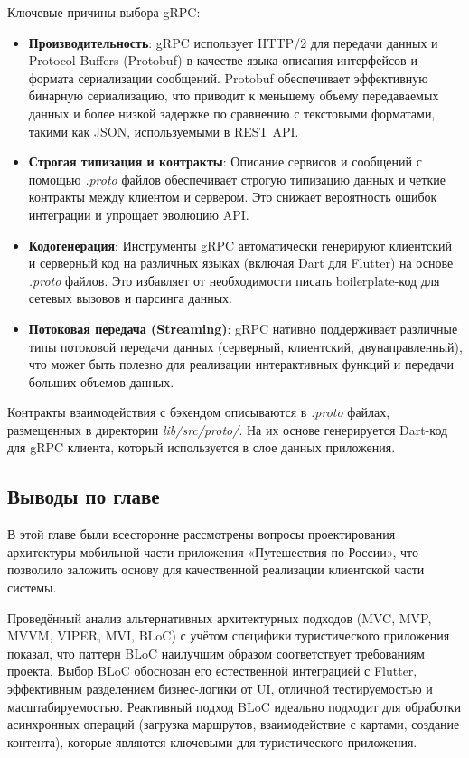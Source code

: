 Ключевые причины выбора gRPC:
\begin{itemize}
    \item \textbf{Производительность}: gRPC использует HTTP/2 для передачи данных и Protocol Buffers (Protobuf) в качестве языка описания интерфейсов и формата сериализации сообщений. Protobuf обеспечивает эффективную бинарную сериализацию, что приводит к меньшему объему передаваемых данных и более низкой задержке по сравнению с текстовыми форматами, такими как JSON, используемыми в REST API.
    \item \textbf{Строгая типизация и контракты}: Описание сервисов и сообщений с помощью \textit{.proto} файлов обеспечивает строгую типизацию данных и четкие контракты между клиентом и сервером. Это снижает вероятность ошибок интеграции и упрощает эволюцию API.
    \item \textbf{Кодогенерация}: Инструменты gRPC автоматически генерируют клиентский и серверный код на различных языках (включая Dart для Flutter) на основе \textit{.proto} файлов. Это избавляет от необходимости писать boilerplate-код для сетевых вызовов и парсинга данных.
    \item \textbf{Потоковая передача (Streaming)}: gRPC нативно поддерживает различные типы потоковой передачи данных (серверный, клиентский, двунаправленный), что может быть полезно для реализации интерактивных функций и передачи больших объемов данных.
\end{itemize}
Контракты взаимодействия с бэкендом описываются в \textit{.proto} файлах, размещенных в директории \textit{lib/src/proto/}. На их основе генерируется Dart-код для gRPC клиента, который используется в слое данных приложения.

\subsection*{Выводы по главе}
В этой главе были всесторонне рассмотрены вопросы проектирования архитектуры мобильной части приложения «Путешествия по России», что позволило заложить основу для качественной реализации клиентской части системы.

Проведённый анализ альтернативных архитектурных подходов (MVC, MVP, MVVM, VIPER, MVI, BLoC) с учётом специфики туристического приложения показал, что паттерн BLoC наилучшим образом соответствует требованиям проекта. Выбор BLoC обоснован его естественной интеграцией с Flutter, эффективным разделением бизнес-логики от UI, отличной тестируемостью и масштабируемостью. Реактивный подход BLoC идеально подходит для обработки асинхронных операций (загрузка маршрутов, взаимодействие с картами, создание контента), которые являются ключевыми для туристического приложения.

